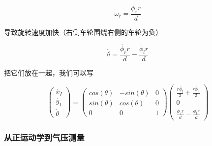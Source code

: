 \begin{equation}
\dot{\omega_r} = \frac{\dot{\phi_r} r}{d}
\end{equation}

导致旋转速度加快（右侧车轮围绕右侧的车轮为负）

\begin{equation}
\dot{\theta}=\frac{\dot{\phi_r} r}{d}-\frac{\dot{\phi_l} r}{d}
\end{equation}

把它们放在一起，我们可以写

\begin{equation}\label{eq:diffwheels}
\left(\begin{array}{c} \dot{x_I}\\\dot{y_I}\\\dot{\theta}\end{array}\right)=\left(\begin{array}{ccc}
cos(\theta) & -sin(\theta) & 0 \\
sin(\theta) & cos(\theta) & 0 \\
0 & 0 & 1\end{array}\right)\left(\begin{array}{c}\frac{r\dot{\phi_l}}{2}+\frac{r\dot{\phi_r}}{2}\\0\\\frac{\dot{\phi_r} r}{d}-\frac{\dot{\phi_l} r}{d}\end{array}\right)
\end{equation}

\subsubsection{从正运动学到气压测量}

